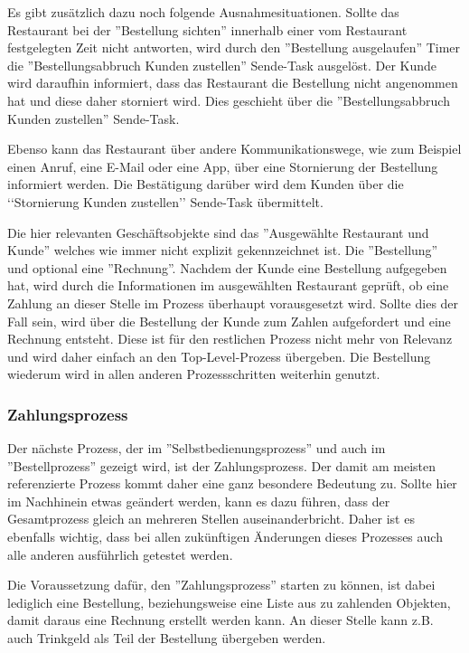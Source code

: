 Es gibt zusätzlich dazu noch folgende Ausnahmesituationen. Sollte das Restaurant bei der ''Bestellung sichten'' innerhalb einer vom Restaurant festgelegten Zeit nicht antworten, wird durch den ''Bestellung ausgelaufen'' Timer die ''Bestellungsabbruch Kunden zustellen'' Sende-Task ausgelöst. Der Kunde wird daraufhin informiert, dass das Restaurant die Bestellung nicht angenommen hat und diese daher storniert wird. Dies geschieht über die ''Bestellungsabbruch Kunden zustellen'' Sende-Task.

Ebenso kann das Restaurant über andere Kommunikationswege, wie zum Beispiel einen Anruf, eine E-Mail oder eine App, über eine Stornierung der Bestellung informiert werden. Die Bestätigung darüber wird dem Kunden über die ‘‘Stornierung Kunden zustellen’’ Sende-Task übermittelt.

Die hier relevanten Geschäftsobjekte sind das ''Ausgewählte Restaurant und Kunde'' welches wie immer nicht explizit gekennzeichnet ist. Die ''Bestellung'' und optional eine ''Rechnung''. Nachdem der Kunde eine Bestellung aufgegeben hat, wird durch die Informationen im ausgewählten Restaurant geprüft, ob eine Zahlung an dieser Stelle im Prozess überhaupt vorausgesetzt wird. Sollte dies der Fall sein, wird über die Bestellung der Kunde zum Zahlen aufgefordert und eine Rechnung entsteht. Diese ist für den restlichen Prozess nicht mehr von Relevanz und wird daher einfach an den Top-Level-Prozess übergeben. Die Bestellung wiederum wird in allen anderen Prozessschritten weiterhin genutzt.

\subsubsection{Zahlungsprozess}
Der nächste Prozess, der im ''Selbstbedienungsprozess'' und auch im ''Bestellprozess'' gezeigt wird, ist der Zahlungsprozess. Der damit am meisten referenzierte Prozess kommt daher eine ganz besondere Bedeutung zu. Sollte hier im Nachhinein etwas geändert werden, kann es dazu führen, dass der Gesamtprozess gleich an mehreren Stellen auseinanderbricht. Daher ist es ebenfalls wichtig, dass bei allen zukünftigen Änderungen dieses Prozesses auch alle anderen ausführlich getestet werden.

Die Voraussetzung dafür, den ''Zahlungsprozess'' starten zu können, ist dabei lediglich eine Bestellung, beziehungsweise eine Liste aus zu zahlenden Objekten, damit daraus eine Rechnung erstellt werden kann. An dieser Stelle kann z.B. auch Trinkgeld als Teil der Bestellung übergeben werden. 

